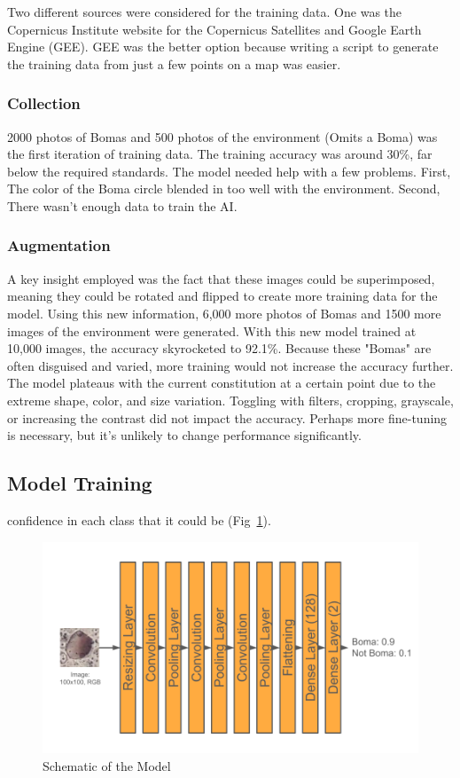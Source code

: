 \documentclass[10pt]{article}
\begin{document}
Two different sources were considered for the training data. One was the Copernicus Institute website for the Copernicus Satellites and Google Earth Engine (GEE). GEE was the better option because writing a script to generate the training data from just a few points on a map was easier.

\subsubsection{Collection}

2000 photos of Bomas and 500 photos of the environment (Omits a Boma) was the first iteration of training data. The training accuracy was around 30\%, far below the required standards. The model needed help with a few problems. First, The color of the Boma circle blended in too well with the environment. Second, There wasn’t enough data to train the AI.

\subsubsection{Augmentation}

A key insight employed was the fact that these images could be superimposed, meaning they could be rotated and flipped to create more training data for the model. Using this new information, 6,000 more photos of Bomas and 1500 more images of the environment were generated. With this new model trained at 10,000 images, the accuracy skyrocketed to 92.1\%. Because these "Bomas" are often disguised and varied, more training would not increase the accuracy further. The model plateaus with the current constitution at a certain point due to the extreme shape, color, and size variation. Toggling with filters, cropping, grayscale, or increasing the contrast did not impact the accuracy. Perhaps more fine-tuning is necessary, but it's unlikely to change performance significantly.

\subsection{Model Training}
\label{training}
 confidence in each class that it could be (Fig~\ref{fig:model_shape}).

\begin{figure} [H] %
    \centering
    \includegraphics[width=1\linewidth]{images/Model Shape.png}
    \caption{Schematic of the Model}
    \label{fig:model_shape}
\end{figure}
\end{document}
